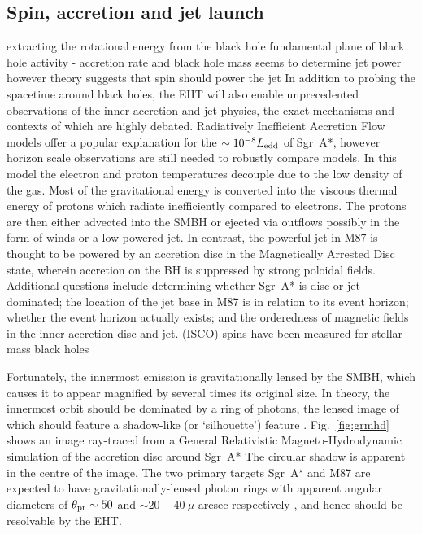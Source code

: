 \subsection{Spin, accretion and jet launch}
% 
extracting the rotational energy from the black hole
fundamental plane of black hole activity - accretion rate and black hole mass seems to determine jet power however theory suggests that spin should power the jet
In addition to probing the spacetime around black holes, the EHT will also enable unprecedented observations of the inner accretion and jet physics, the exact mechanisms and contexts of which are highly debated. Radiatively Inefficient Accretion Flow \citep[(RIAF),][]{Narayan_1995,Yuan_2003} models offer a popular explanation for the $\sim 10^{-8} L_{\rm edd}$ of Sgr~A*, however horizon scale observations are still needed to robustly compare models. In this model the electron and proton temperatures decouple due to the low density of the gas. Most of the gravitational energy is converted into the viscous thermal energy of protons which radiate inefficiently compared to electrons. The protons are then either advected into the SMBH or ejected via outflows possibly in the form of winds or a low powered jet. In contrast, the powerful jet in M87 is thought to be powered by an accretion disc in the Magnetically Arrested Disc \citep[(MAD),][]{Narayan_2003} state, wherein accretion on the BH is suppressed by strong poloidal fields. Additional questions include determining whether Sgr~A* is disc or jet dominated; the location of the jet base in M87 is in relation to its event horizon; whether the event horizon actually exists; and the orderedness of magnetic fields in the inner accretion disc and jet.
(ISCO)
spins have been measured for stellar mass black holes

Fortunately, the innermost emission is gravitationally lensed by the SMBH, which causes it to appear magnified by several times its original size. In theory, the innermost orbit should be dominated by a ring of photons, the lensed image of which should feature a shadow-like (or `silhouette') feature \citep[e.g.][]{Johannsen_2010}. Fig.~\ref{fig:grmhd} shows an image ray-traced from a General Relativistic Magneto-Hydrodynamic simulation of the accretion disc around Sgr~A* \citep{Moscibrodzka_2014} The circular shadow is apparent in the centre of the image. The two primary targets Sgr~A$^\star$ and M87 are expected to have gravitationally-lensed photon rings with apparent angular diameters of $\theta_{\rm pr} \sim 50$ and $\sim 20-40\ \mu$-arcsec respectively \citep*{Broderick_2009,Falcke_2013}, and hence should be resolvable by the EHT. 



